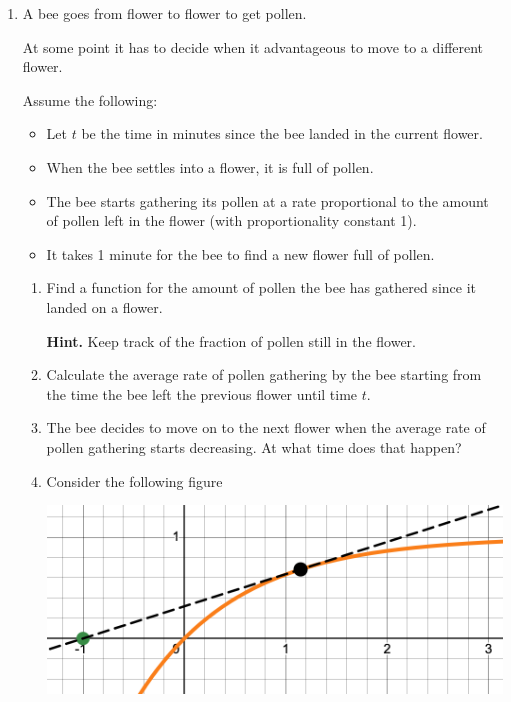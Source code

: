 \begin{enumerate}
	\item\label{q1} A bee goes from flower to flower to get pollen.
	
	At some point it has to decide when it advantageous to move to a different flower.
	
	Assume the following:
	\begin{itemize}
		\item Let $t$ be the time in minutes since the bee landed in the current flower.
		\item When the bee settles into a flower, it is full of pollen.
		\item The bee starts gathering its pollen at a rate proportional to the amount of pollen left in the flower (with proportionality constant 1).
		\item It takes 1 minute for the bee to find a new flower full of pollen.
	\end{itemize}
	
	\begin{enumerate}
		\item Find a function for the amount of pollen the bee has gathered since it landed on a flower.

		\textbf{Hint. } Keep track of the fraction of pollen still in the flower.
		


		\item Calculate the average rate of pollen gathering by the bee starting from the time the bee left the previous flower until time $t$.



		\item The bee decides to move on to the next flower when the average rate of pollen gathering starts decreasing. At what time does that happen?

		
%		
%		
%		
		

	\item Consider the following figure
	\begin{center}
		\includegraphics[width=.5\textwidth]{bees.png}
	\end{center}
	

\end{enumerate}
\end{enumerate}
